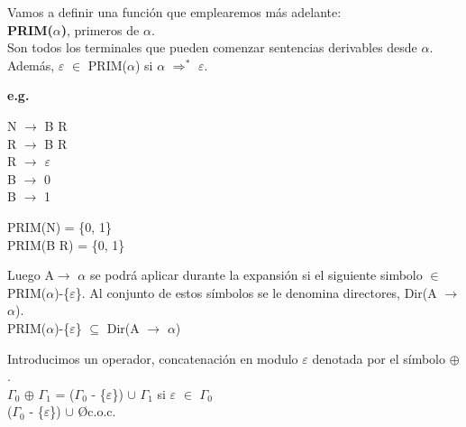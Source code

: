 \documentclass[\main/ApuntesPL.tex]{subfiles}
\begin{document}
    \bigskip
    \par
    Vamos a definir una función que emplearemos más adelante:\\
    \vspace{2mm}
    {\large \textbf{PRIM($\alpha$)}}, primeros de $\alpha$.\\
    Son todos los terminales que pueden comenzar sentencias derivables desde $\alpha$. Además,
    $\varepsilon$ $\in$ PRIM($\alpha$) si $\alpha$ $\Rightarrow^\ast$ $\varepsilon$.

    \par
    \textbf{e.g.}
    \begin{center}
      \begin{minipage}{.3\textwidth}
        \hspace*{5mm}N $\rightarrow$ B R\\
        \hspace*{5mm}R $\rightarrow$ B R\\
        \hspace*{5mm}R $\rightarrow$ $\varepsilon$\\
        \hspace*{5mm}B $\rightarrow$ 0\\
        \hspace*{5mm}B $\rightarrow$ 1
      \end{minipage}%
      \begin{minipage}{.7\textwidth}
        PRIM(N) = \{0, 1\}\\
        PRIM(B R) = \{0, 1\}
      \end{minipage}
    \end{center}

    \par
    Luego A$\rightarrow$ $\alpha$ se podrá aplicar durante la expansión si el siguiente simbolo
    $\in$ PRIM($\alpha$)-\{$\varepsilon$\}. Al conjunto de estos símbolos se le denomina
    directores, Dir(A $\rightarrow$ $\alpha$).\\
    \vspace{2mm}
    \hspace{5mm}PRIM($\alpha$)-\{$\varepsilon$\} $\subseteq$ Dir(A $\rightarrow$ $\alpha$)

    \par
    Introducimos un operador, concatenación en modulo $\varepsilon$ denotada por el símbolo
    $\oplus$.\\
    \vspace{2mm}
    \hspace{5mm}$\Gamma_0$ $\oplus$ $\Gamma_1$ = ($\Gamma_0$ - \{$\varepsilon$\}) $\cup$ $\Gamma_1$
      \hspace{10mm}si $\varepsilon$ $\in$ $\Gamma_0$\\
    \hspace{24.5mm}($\Gamma_0$ - \{$\varepsilon$\}) $\cup$ \O \hspace{11mm}c.o.c.
\end{document}
